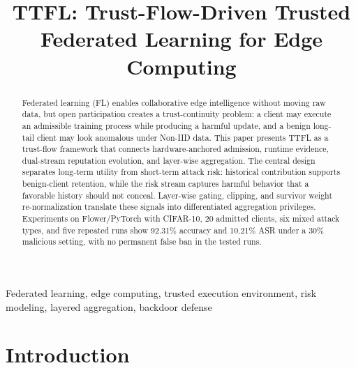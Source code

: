 \documentclass[conference,compsoc]{IEEEtran}
\begin{document}
\title{TTFL: Trust-Flow-Driven Trusted Federated Learning for Edge Computing}

\author{
    }

\maketitle

\begin{abstract}
    Federated learning (FL) enables collaborative edge intelligence without moving raw data, but open participation creates a trust-continuity problem: a client may execute an admissible training process while producing a harmful update, and a benign long-tail client may look anomalous under Non-IID data. This paper presents TTFL as a trust-flow framework that connects hardware-anchored admission, runtime evidence, dual-stream reputation evolution, and layer-wise aggregation. The central design separates long-term utility from short-term attack risk: historical contribution supports benign-client retention, while the risk stream captures harmful behavior that a favorable history should not conceal. Layer-wise gating, clipping, and survivor weight re-normalization translate these signals into differentiated aggregation privileges. Experiments on Flower/PyTorch with CIFAR-10, 20 admitted clients, six mixed attack types, and five repeated runs show 92.31\% accuracy and 10.21\% ASR under a 30\% malicious setting, with no permanent false ban in the tested runs.

\end{abstract}

\begin{IEEEkeywords}
    Federated learning, edge computing, trusted execution environment, risk modeling, layered aggregation, backdoor defense
\end{IEEEkeywords}

\section{Introduction}
\end{document}
